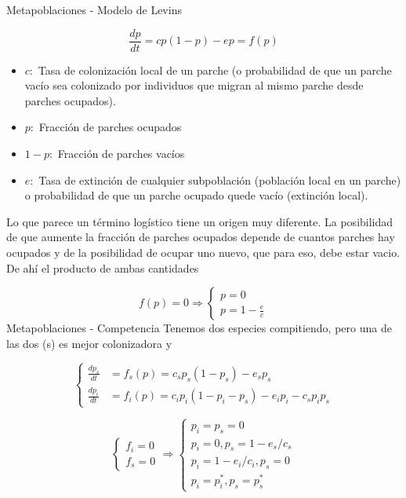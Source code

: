 \documentclass[twocolumn,aps,prl]{revtex4-1}
\begin{document}
Metapoblaciones - Modelo de Levins


$$\frac{d p}{d t}=c p(1-p)-e p = f(p)$$

\begin{itemize}
    \item $c:$ Tasa de colonización local de un parche (o probabilidad de que un parche vacío sea colonizado por individuos que migran al mismo parche desde parches ocupados). 
    \item $p:$ Fracción de parches ocupados
    \item $1-p:$ Fracción de parches vacíos
    \item $e:$ Tasa de extinción de cualquier subpoblación (población local en un parche) o probabilidad de que un parche ocupado quede vacío (extinción local).
\end{itemize}

Lo que parece un término logístico tiene un origen muy diferente. La posibilidad de que aumente la fracción de parches ocupados depende de cuantos parches hay ocupados y de la posibilidad de ocupar uno nuevo, que para eso, debe estar vacio. De ahí el producto de ambas cantidades

$$
f(p) = 0 \Rightarrow\left\{
\begin{array}{l}
    p=0 \\ 
    p=1-\frac{e}{c}
\end{array}
\right.
$$
Metapoblaciones - Competencia
Tenemos dos especies compitiendo, pero una de las dos (s) es mejor colonizadora y

$$
\left\{
\begin{aligned}
    \frac{d p_{s}}{d t} &=f_{s}(p)=c_{s} p_{s}\left(1-p_{s}\right)-e_{s} p_{s} \\ 
    \frac{d p_{i}}{d t} &=f_{i}(p)=c_{i} p_{i}\left(1-p_{i}-p_{s}\right)-e_{i} p_{i}-c_{s} p_{i} p_{s}
\end{aligned} 
\right.
$$

$$
\left\{
\begin{array} { l } 
    { f _ { i } = 0 } \\
    { f _ { s } = 0 }
\end{array} 
\right. 
\Rightarrow 
\left\{
\begin{array}{l}
    p_{i}=p_{s}=0 \\
    p_{i}=0, p_{s}=1-e_{s} / c_{s} \\
    p_{i}=1-e_{i} / c_{i}, p_{s}=0 \\
    p_{i}=p_{i}^{*}, p_{s}=p_{s}^{*}
\end{array}
\right.
$$
\end{document}
